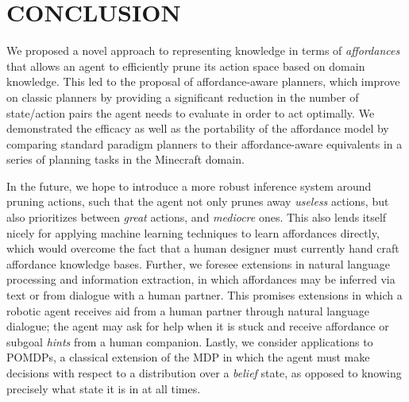 \documentclass[]{article}
\begin{document}
\section{CONCLUSION}

We proposed a novel approach to representing knowledge in terms of
{\em affordances}~\citep{gibson77} that allows an agent to efficiently
prune its action space based on domain knowledge. This led to the 
proposal of affordance-aware planners, which improve on classic planners
by providing a significant reduction in the number of state/action pairs the
agent needs to evaluate in order to act optimally. We demonstrated the efficacy 
as well as the portability of the affordance model by comparing standard paradigm
planners to their affordance-aware equivalents in a series of planning tasks in the Minecraft
domain.

In the future, we hope to introduce a more robust inference system around pruning actions, such that
the agent not only prunes away {\it useless} actions, but also prioritizes between
{\it great} actions, and {\it mediocre} ones. This also lends itself nicely for applying
machine learning techniques to learn affordances directly, which would 
overcome the fact that a human designer must currently hand craft affordance knowledge bases.
Further, we foresee extensions in natural language processing and information
extraction, in which affordances may be inferred via text or from dialogue with a human partner.
This promises extensions in which a robotic agent receives aid from a human partner through natural language
dialogue; the agent may ask for help when it is stuck and
receive affordance or subgoal {\it hints} from a human companion. Lastly, we consider applications to
POMDPs, a classical extension of the MDP in which the agent must make decisions with respect to a distribution over a {\it belief} state,
as opposed to knowing precisely what state it is in at all times.


  
\end{document}
